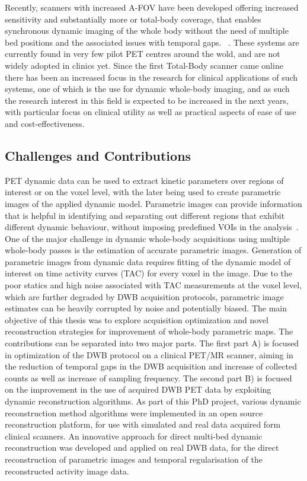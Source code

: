 Recently, scanners with increased A-FOV have been developed offering increased sensitivity and substantially more or total-body coverage, that enables synchronous dynamic imaging of the whole body without the need of multiple bed positions and the associated issues with temporal gaps. ~\cite{Karp2020,Siegel2020, Cherry2018}.
These systems are currently found in very few pilot PET centres around the wold, and are not widely adopted in clinics yet. Since the first Total-Body scanner came online there has been an increased focus in the research for clinical applications of such systems, one of which is the use for dynamic whole-body imaging, and as such the research interest in this field is expected to be increased in the next years, with particular focus on clinical utility as well as practical aspects of ease of use and cost-effectiveness.

\subsection*{Challenges and Contributions}
PET dynamic data can be used to extract kinetic parameters over regions of interest or on the voxel level, with the later being used to create parametric images of the applied dynamic model.
Parametric images can provide information that is helpful in identifying and separating out different regions that exhibit different dynamic behaviour, without imposing predefined VOIs in the analysis~\cite{Gallezot2019}.  
One of the major challenge in dynamic whole-body acquisitions using multiple whole-body passes is the estimation of accurate parametric images. Generation of parametric images from dynamic data requires fitting of the dynamic model of interest on time activity curves (TAC) for every voxel in the image. Due to the poor statics and high noise associated with TAC measurements at the voxel level, which are further degraded by DWB acquisition protocols, parametric image estimates can be heavily corrupted by noise and potentially biased. 
The main objective of this thesis was to explore acquisition optimization and novel reconstruction strategies for improvement of whole-body parametric maps. 
The contributions can be separated into two major parts. The first part A) is focused in optimization of the DWB protocol on a clinical PET/MR scanner, aiming in the reduction of temporal gaps in the DWB acquisition and increase of collected counts as well as increase of sampling frequency. The second part B) is focused on the improvement in the use of acquired DWB PET data by exploiting dynamic reconstruction algorithms. As part of this PhD project, various dynamic reconstruction method algorithms were implemented in an open source reconstruction platform, for use with simulated and real data acquired form clinical scanners. An innovative approach for direct multi-bed dynamic reconstruction was developed and applied on real DWB data, for the direct reconstruction of parametric images and temporal regularisation of the reconstructed activity image data.

